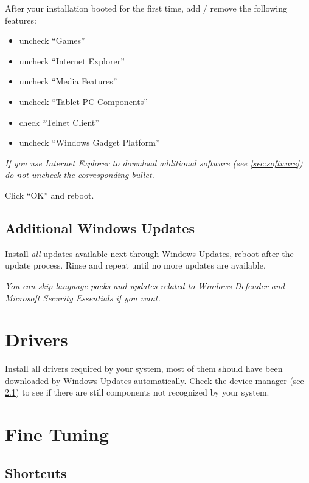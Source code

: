 \documentclass{itsarticle}
\begin{document}
After your installation booted for the first time, add / remove the following
features:


\begin{itemize}
    \item uncheck ``Games''
    \item uncheck ``Internet Explorer''
    \item uncheck ``Media Features''
    \item uncheck ``Tablet PC Components''
    \item check ``Telnet Client''
    \item uncheck ``Windows Gadget Platform''
\end{itemize}

\textit{If you use Internet Explorer to download additional software (see
\cref{sec:software}) do not uncheck the corresponding bullet.}

Click ``OK'' and reboot.

\subsection{Additional Windows Updates}
\label{ssec:updates_post_install}

Install \emph{all} updates available next through Windows Updates, reboot after
the update process. Rinse and repeat until no more updates are available.

\textit{You can skip language packs and updates related to Windows Defender and
Microsoft Security Essentials if you want.}

\section{Drivers}
\label{sec:drivers}

Install all drivers required by your system, most of them should have been
downloaded by Windows Updates automatically. Check the device manager (see
\cref{ssec:shortcuts}) to see if there are still components not recognized by
your system.

\section{Fine Tuning}
\label{sec:fine_tuning}

\subsection{Shortcuts}
\label{ssec:shortcuts}
\end{document}

